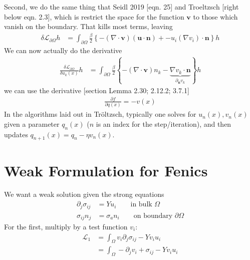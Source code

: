 \documentclass{article}
\newcommand{\bu}{\mathbf{u}}
\newcommand{\bn}{\mathbf{n}}
\newcommand{\bv}{\mathbf{v}}
\begin{document}
Second, we do the same thing that Seidl 2019 [eqn. 25] and Troeltzsch [right below eqn. 2.3], which is restrict the space for the function $\bv$ to those which vanish on the boundary. That kills most terms, leaving
\begin{align*}
    \delta \mathcal{L}_{\partial\Omega} h 
    &= \int_{\partial\Omega}\frac{\beta}{2}\left\{- (\nabla\cdot \bv)(\bu\cdot\bn)
    + - u_i(\nabla v_i)\cdot \bn \right\}h
\end{align*}
We can now actually do the derivative 
\begin{align*}
    \frac{\delta \mathcal{L}_{\partial\Omega}}{\delta u_k(x)} h
    &= \int_{\partial\Omega}\frac{\beta}{2}\left\{- (\nabla\cdot \bv)n_k
    - \underbrace{\nabla v_k \cdot \bn}_{\partial_{\bn}v_k} \right\}h
\end{align*}
\newpage
we can use the derivative \cite{Troeltzsch2010}[section Lemma 2.30; 2.12.2; 3.7.1]
\begin{align*}
    \frac{\partial f}{\partial q(x)} = -v(x)
\end{align*}
In the algorithms laid out in Tr{\"o}ltzsch, typically one solves for $u_n(x), v_n(x)$ given a parameter $q_n(x)$ ($n$ is an index for the step/iteration), and then updates $q_{n+1}(x)=q_{n}-\eta v_n(x)$.

\section{Weak Formulation for Fenics}
We want a weak solution given the strong equations
\begin{align*}
    \partial_j \sigma_{ij} &= Yu_i \quad\quad\text{in bulk $\Omega$}
    \\
    \sigma_{ij}n_j&=\sigma_a n_i\quad\quad\text{on boundary $\partial\Omega$}
\end{align*}
For the first, multiply by a test function $v_i$:
\begin{align*}
    \mathcal{L}_1&=\int_{\Omega} v_i\partial_j\sigma_{ij} - Yv_i u_i 
    \\
    &=\int_{\Omega} -\partial_j v_i + \sigma_{ij} - Yv_i u_i 
\end{align*}
\fi
\end{document}
